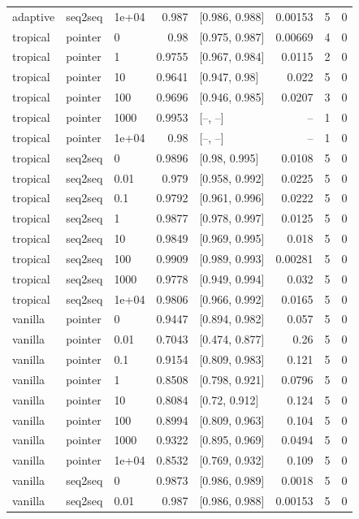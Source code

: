 \documentclass[10pt]{article}
\begin{document}
{\begin{longtable}{lllrlrrr}
adaptive & seq2seq & 1e+04 & 0.987 & [0.986, 0.988] & 0.00153 & 5 & 0\\
tropical & pointer & 0 & 0.98 & [0.975, 0.987] & 0.00669 & 4 & 0\\
tropical & pointer & 1 & 0.9755 & [0.967, 0.984] & 0.0115 & 2 & 0\\
tropical & pointer & 10 & 0.9641 & [0.947, 0.98] & 0.022 & 5 & 0\\
tropical & pointer & 100 & 0.9696 & [0.946, 0.985] & 0.0207 & 3 & 0\\
tropical & pointer & 1000 & 0.9953 & [--, --] & -- & 1 & 0\\
tropical & pointer & 1e+04 & 0.98 & [--, --] & -- & 1 & 0\\
tropical & seq2seq & 0 & 0.9896 & [0.98, 0.995] & 0.0108 & 5 & 0\\
tropical & seq2seq & 0.01 & 0.979 & [0.958, 0.992] & 0.0225 & 5 & 0\\
tropical & seq2seq & 0.1 & 0.9792 & [0.961, 0.996] & 0.0222 & 5 & 0\\
tropical & seq2seq & 1 & 0.9877 & [0.978, 0.997] & 0.0125 & 5 & 0\\
tropical & seq2seq & 10 & 0.9849 & [0.969, 0.995] & 0.018 & 5 & 0\\
tropical & seq2seq & 100 & 0.9909 & [0.989, 0.993] & 0.00281 & 5 & 0\\
tropical & seq2seq & 1000 & 0.9778 & [0.949, 0.994] & 0.032 & 5 & 0\\
tropical & seq2seq & 1e+04 & 0.9806 & [0.966, 0.992] & 0.0165 & 5 & 0\\
vanilla & pointer & 0 & 0.9447 & [0.894, 0.982] & 0.057 & 5 & 0\\
vanilla & pointer & 0.01 & 0.7043 & [0.474, 0.877] & 0.26 & 5 & 0\\
vanilla & pointer & 0.1 & 0.9154 & [0.809, 0.983] & 0.121 & 5 & 0\\
vanilla & pointer & 1 & 0.8508 & [0.798, 0.921] & 0.0796 & 5 & 0\\
vanilla & pointer & 10 & 0.8084 & [0.72, 0.912] & 0.124 & 5 & 0\\
vanilla & pointer & 100 & 0.8994 & [0.809, 0.963] & 0.104 & 5 & 0\\
vanilla & pointer & 1000 & 0.9322 & [0.895, 0.969] & 0.0494 & 5 & 0\\
vanilla & pointer & 1e+04 & 0.8532 & [0.769, 0.932] & 0.109 & 5 & 0\\
vanilla & seq2seq & 0 & 0.9873 & [0.986, 0.989] & 0.0018 & 5 & 0\\
vanilla & seq2seq & 0.01 & 0.987 & [0.986, 0.988] & 0.00153 & 5 & 0\\

\end{longtable}}
\end{document}
